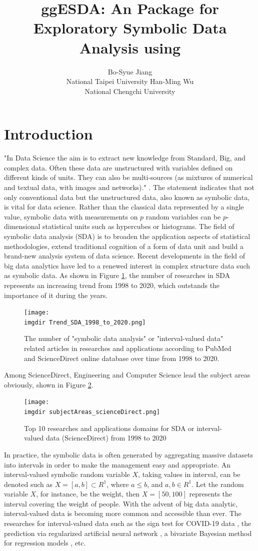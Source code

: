 \documentclass[article]{jss}
\author{Bo-Syue Jiang\\National Taipei University
\And Han-Ming Wu\\National Chengchi University}
\title{ggESDA: An \proglang{R} Package for Exploratory Symbolic Data Analysis using \pkg{ggplot2}}
\newcommand{\imgdir}{../../../paperImage/}
\begin{document}
\section{Introduction}
"In Data Science the aim is to extract new knowledge from Standard, Big, and complex data. Often these data are unstructured with variables defined on different kinds of units. They can also be multi-sources (as mixtures of numerical and textual data, with images and networks)." \cite{Diday:2018}. The statement indicates that not only conventional data but the unstructured data, also known as symbolic data, is vital for data science. Rather than the classical data represented by a single value, symbolic data with measurements on $p$ random variables can be $p$-dimensional statistical units such as hypercubes or histograms. The field of symbolic data analysis (SDA) \cite{Billard+Diday:2007} is to broaden the application aspects of statistical methodologies, extend traditional cognition of a form of data unit and build a brand-new analysis system of data science. Recent developments in the field of big data analytics have led to a renewed interest in complex structure data such as symbolic data. As shown in Figure \ref{fig:trend}, the number of researches in SDA represents an increasing trend from 1998 to 2020, which outstands the importance of it during the years.
\begin{figure}[h]	
  		\centering	 			 	 
 	 		\texttt{[image: \\imgdir Trend\_SDA\_1998\_to\_2020.png]} 
  		\caption{The number of "symbolic data analysis" or "interval-valued data" related articles in researches and applications according to PubMed and ScienceDirect online database over time from 1998 to 2020.}   		
  		\label{fig:trend}   			 		 
\end{figure}
Among ScienceDirect, Engineering and Computer Science lead the subject areas obviously, shown in Figure \ref{fig:subjectAreas}.
\begin{figure}[h]	
  		\centering	 			 	 
 	 		\texttt{[image: \\imgdir subjectAreas\_scienceDirect.png]} 
  		\caption{Top 10 researches and applications domains for SDA or interval-valued data (ScienceDirect) from 1998 to 2020} 
  		\label{fig:subjectAreas}   			 		 
\end{figure}


In practice, the symbolic data is often generated by aggregating massive datasets into intervals in order to make the management easy and appropriate. An interval-valued symbolic random variable $X$, taking values in interval, can be denoted such as $X = [a,b] \subset  R^{1}$, where $a \leq b$, and $a, b \in R^{1}$. Let the random variable $X$, for instance, be the weight, then $X = [50,100]$ represents the interval covering the weight of people. With the advent of big data analytic, interval-valued data is becoming more common and accessible than ever. The researches for interval-valued data such as the sign test for COVID-19 data \cite{sherwani:2021}, the prediction via regularized artificial neural network \cite{yang:2019}, a bivariate Bayesian method for regression models \cite{xu:2021}, etc.
\end{document}
